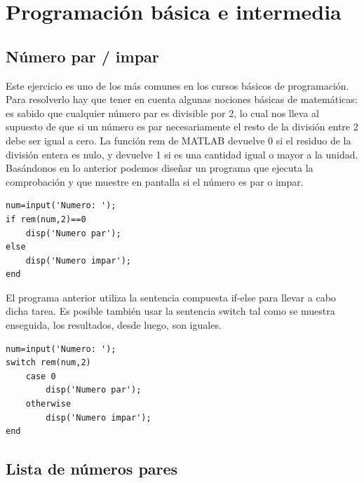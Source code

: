 \chapter{Programación básica e intermedia}

\section{Número par / impar}


\sol

Este ejercicio es uno de los más comunes en los cursos básicos de programación. 
Para resolverlo hay que tener en cuenta algunas nociones básicas de matemáticas: es 
sabido que cualquier número par es divisible por 2, lo cual nos lleva al supuesto de que 
si un número es par necesariamente el resto de la división entre 2 debe ser igual a cero. 
La función rem de MATLAB devuelve 0 si el residuo de la división entera es nulo, y devuelve 1 
si es una cantidad igual o mayor a la unidad. Basándonos en lo anterior podemos diseñar 
un programa que ejecuta la comprobación y que muestre en pantalla si el número es par o impar.

\begin{verbatim}
num=input('Numero: ');
if rem(num,2)==0
    disp('Numero par');
else
    disp('Numero impar');
end
\end{verbatim}

El programa anterior utiliza la sentencia compuesta if-else para llevar a cabo dicha tarea. 
Es posible también usar la sentencia switch tal como se muestra enseguida, los resultados, desde luego, son iguales.

\begin{verbatim}
num=input('Numero: ');
switch rem(num,2)
    case 0
        disp('Numero par');
    otherwise
        disp('Numero impar');
end
\end{verbatim}


\section{Lista de números pares}


